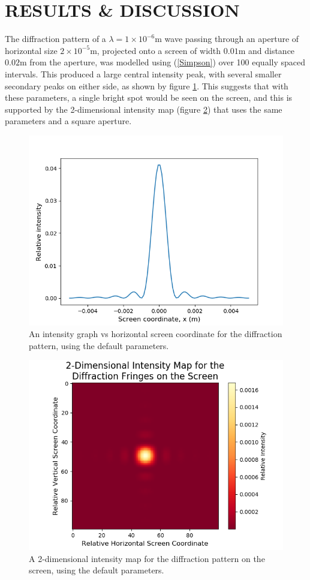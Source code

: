 \documentclass[twocolumn,prl,nobalancelastpage,aps,10pt]{revtex4-1}
\begin{document}
\section{RESULTS \& DISCUSSION}

The diffraction pattern of a $\lambda = 1 \times 10^{-6}$m wave passing through an aperture of horizontal size $2\times10^{-5}$m, projected onto a screen of width $0.01$m and distance $0.02$m from the aperture, was modelled using (\ref{Simpson}) over 100 equally spaced intervals. This produced a large central intensity peak, with several smaller secondary peaks on either side, as shown by figure \ref{1D_Default}. This suggests that with these parameters, a single bright spot would be seen on the screen, and this is supported by the 2-dimensional intensity map (figure \ref{2D_Default}) that uses the same parameters and a square aperture.

\begin{figure}[!ht]
	\includegraphics*[width=0.96\linewidth,clip]{1D_Default}
	\caption{An intensity graph vs horizontal screen coordinate for the diffraction pattern, using the default parameters.} \label{1D_Default}
\end{figure}

\begin{figure}
\includegraphics*[width=0.96\linewidth,clip]{2D_Default}
\caption{A 2-dimensional intensity map for the diffraction pattern on the screen, using the default parameters.} \label{2D_Default}
\end{figure}
\end{document}
